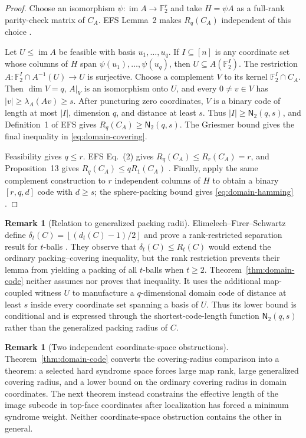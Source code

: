 \documentclass[11pt,letterpaper]{article}
\theoremstyle{plain}
\theoremstyle{definition}
\newtheorem{remark}[theorem]{Remark}
\newcommand{\F}{\mathbb{F}_2}
\newcommand{\im}{\operatorname{im}}
\newcommand{\1}{\mathbf{1}}
\newcommand{\abs}[1]{\left|#1\right|}
\newcommand{\floor}[1]{\left\lfloor#1\right\rfloor}
\begin{document}
\begin{proof}
Choose an isomorphism $\psi:\im A\to\F^r$ and take $H=\psi A$ as a
full-rank parity-check matrix of $C_A$.  EFS Lemma~2 makes $R_q(C_A)$
independent of this choice \cite[Lemma~2]{elimelech2021}.

Let $U\le\im A$ be feasible with basis $u_1,\ldots,u_q$.  If $I\subseteq[n]$
is any coordinate set whose columns of $H$ span
$\psi(u_1),\ldots,\psi(u_q)$, then $U\subseteq A(\F^I)$.  The restriction
$A:\F^I\cap A^{-1}(U)\to U$ is surjective.  Choose a complement $V$ to its
kernel $\F^I\cap C_A$.  Then $\dim V=q$, $A|_V$ is an isomorphism onto $U$,
and every $0\ne v\in V$ has $\abs v\ge\lambda_A(Av)\ge s$.  After
puncturing zero coordinates, $V$ is a binary code of length at most $\abs I$,
dimension $q$, and distance at least $s$.  Thus $\abs I\ge\mathsf N_2(q,s)$,
and Definition~1 of EFS gives $R_q(C_A)\ge\mathsf N_2(q,s)$.  The Griesmer
bound gives the final inequality in \eqref{eq:domain-covering}.

Feasibility gives $q\le r$.  EFS Eq.~(2) gives $R_q(C_A)\le R_r(C_A)=r$,
and Proposition~13 gives $R_q(C_A)\le qR_1(C_A)$
\cite[Eq.~(2) and Proposition~13]{elimelech2021}.  Finally, apply the same
complement construction to $r$ independent columns of $H$ to obtain a binary
$[r,q,d]$ code with $d\ge s$; the sphere-packing bound gives
\eqref{eq:domain-hamming} \cite{macwilliamssloane1977}.
\end{proof}

\begin{remark}[Relation to generalized packing radii]
Elimelech--Firer--Schwartz define
$\delta_t(C)=\floor{(d_t(C)-1)/2}$ and prove a rank-restricted separation result for
$t$-balls \cite[Section~VI and Lemma~27]{elimelech2021}.  They observe that
$\delta_t(C)\le R_t(C)$ would extend the ordinary packing--covering inequality, but the
rank restriction prevents their lemma from yielding a packing of all $t$-balls when
$t\ge2$.  Theorem~\ref{thm:domain-code} neither assumes nor proves that inequality.  It
uses the additional map-coupled witness $U$ to manufacture a $q$-dimensional domain
code of distance at least $s$ inside every coordinate set spanning a basis of $U$.
Thus its lower bound is conditional and is expressed through the shortest-code-length
function $\mathsf N_2(q,s)$ rather than the generalized packing radius of $C$.
\end{remark}

\begin{remark}[Two independent coordinate-space obstructions]
Theorem~\ref{thm:domain-code} converts the covering-radius comparison into a theorem:
a selected hard syndrome space forces large map rank, large generalized covering
radius, and a lower bound on the ordinary covering radius in domain coordinates.
The next theorem instead constrains the effective length of the image subcode in top-face
coordinates after localization has forced a minimum syndrome weight.  Neither
coordinate-space obstruction contains the other in general.
\end{remark}
\end{document}
